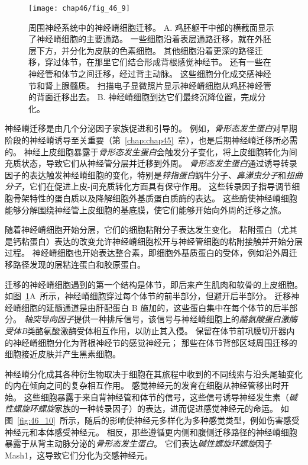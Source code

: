 \begin{figure}[htbp]
	\centering
	\texttt{[image: chap46/fig\_46\_9]}
	\caption{周围神经系统中的神经嵴细胞迁移。
		A. 鸡胚躯干中部的横截面显示了神经嵴细胞的主要通路。
		一些细胞沿着表层通路迁移，就在外胚层下方，并分化为皮肤的色素细胞。
		其他细胞沿着更深的路径迁移，穿过体节，在那里它们结合形成背根感觉神经节。
		还有一些在神经管和体节之间迁移，经过背主动脉。
		这些细胞分化成交感神经节和肾上腺髓质。
		扫描电子显微照片显示神经嵴细胞从鸡胚神经管的背面迁移出去。
		B. 神经嵴细胞到达它们最终沉降位置，完成分化。}
	\label{fig:46_9}
\end{figure}


神经嵴迁移是由几个分泌因子家族促进和引导的。
例如，\textit{骨形态发生蛋白}对早期阶段的神经嵴诱导至关重要（第~\ref{chap:chap45}~章），也是后期神经嵴迁移所必需的。
神经上皮细胞暴露于\textit{骨形态发生蛋白}会触发分子变化，将上皮细胞转化为间充质状态，导致它们从神经管分层并迁移到外周。
\textit{骨形态发生蛋白}通过诱导转录因子的表达触发神经嵴细胞的变化，特别是\textit{锌指蛋白}蜗牛分子、\textit{鼻涕虫分子}和\textit{扭曲分子}，它们在促进上皮-间充质转化方面具有保守作用。
这些转录因子指导调节细胞骨架特性的蛋白质以及降解细胞外基质蛋白质酶的表达。
这些酶使神经嵴细胞能够分解围绕神经管上皮细胞的基底膜，使它们能够开始向外周的迁移之旅。


随着神经嵴细胞开始分层，它们的细胞粘附分子表达发生变化。
粘附蛋白（尤其是钙粘蛋白）表达的改变允许神经嵴细胞松开与神经管细胞的粘附接触并开始分层过程。
神经嵴细胞也开始表达整合素，即细胞外基质蛋白的受体，例如沿外周迁移路径发现的层粘连蛋白和胶原蛋白。


迁移的神经嵴细胞遇到的第一个结构是体节，即后来产生肌肉和软骨的上皮细胞。
如图~\ref{fig:46_9}A~所示，神经嵴细胞穿过每个体节的前半部分，但避开后半部分。
迁移神经嵴细胞的延髓通道是由肝配蛋白 B 施加的，这些蛋白集中在每个体节的后半部分。
\textit{轴突导向因子}提供一种排斥信号，该信号与神经嵴细胞上的\textit{酪氨酸蛋白激酶受体B}类酪氨酸激酶受体相互作用，以防止其入侵。
保留在体节前巩膜切开器内的神经嵴细胞分化为背根神经节的感觉神经元；
那些在体节背部区域周围迁移的细胞接近皮肤并产生黑素细胞。


神经嵴分化成其各种衍生物取决于细胞在其旅程中收到的不同线索与沿头尾轴变化的内在倾向之间的复杂相互作用。
感觉神经元的发育在细胞从神经管移出时开始。
这些细胞暴露于来自背神经管和体节的信号，这些信号诱导神经发生素（\textit{碱性螺旋环螺旋}家族的一种转录因子）的表达，进而促进感觉神经元的命运。
如图~\ref{fig:46_10}~所示，随后的影响使神经元多样化为多种感觉类型，例如伤害感受神经元和本体感受神经元。
相反，那些遵循更内侧和腹侧迁移路径的神经嵴细胞暴露于从背主动脉分泌的\textit{骨形态发生蛋白}。
它们表达\textit{碱性螺旋环螺旋}因子 Mash1，这导致它们分化为交感神经元。


